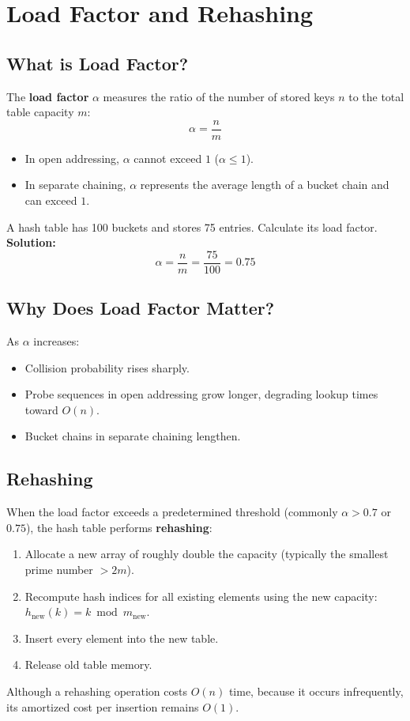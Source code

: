 \section{Load Factor and Rehashing}

\subsection{What is Load Factor?}
The \textbf{load factor} $\alpha$ measures the ratio of the number of stored keys $n$ to the total table capacity $m$:
\[
\boxed{\alpha = \frac{n}{m}}
\]
\begin{itemize}
    \item In open addressing, $\alpha$ cannot exceed $1$ ($\alpha \leq 1$).
    \item In separate chaining, $\alpha$ represents the average length of a bucket chain and can exceed $1$.
\end{itemize}

\begin{tcolorbox}[title=\textbf{Worked Example: Load Factor}]
A hash table has 100 buckets and stores 75 entries. Calculate its load factor.\\
\textbf{Solution:}
\[
\alpha = \frac{n}{m} = \frac{75}{100} = 0.75
\]
\end{tcolorbox}

\subsection{Why Does Load Factor Matter?}
As $\alpha$ increases:
\begin{itemize}
    \item Collision probability rises sharply.
    \item Probe sequences in open addressing grow longer, degrading lookup times toward $O(n)$.
    \item Bucket chains in separate chaining lengthen.
\end{itemize}

\subsection{Rehashing}
When the load factor exceeds a predetermined threshold (commonly $\alpha > 0.7$ or $0.75$), the hash table performs \textbf{rehashing}:
\begin{enumerate}
    \item Allocate a new array of roughly double the capacity (typically the smallest prime number $> 2m$).
    \item Recompute hash indices for all existing elements using the new capacity: $h_{\text{new}}(k) = k \bmod m_{\text{new}}$.
    \item Insert every element into the new table.
    \item Release old table memory.
\end{enumerate}
Although a rehashing operation costs $O(n)$ time, because it occurs infrequently, its amortized cost per insertion remains $O(1)$.

